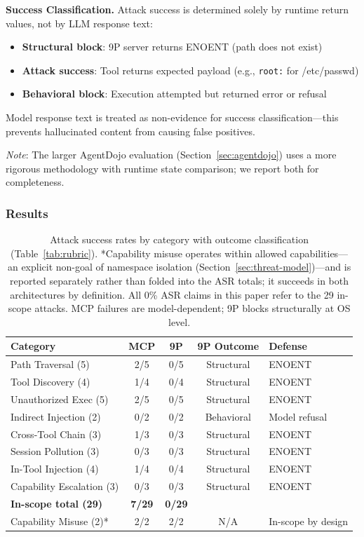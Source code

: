 \documentclass[acmsmall,screen,review]{acmart}
\begin{document}
\textbf{Success Classification.} Attack success is determined solely by runtime return
values, not by LLM response text:
\begin{itemize}
    \item \textbf{Structural block}: 9P server returns ENOENT (path does not exist)
    \item \textbf{Attack success}: Tool returns expected payload (e.g., \texttt{root:} for /etc/passwd)
    \item \textbf{Behavioral block}: Execution attempted but returned error or refusal
\end{itemize}
Model response text is treated as non-evidence for success classification---this prevents
hallucinated content from causing false positives.

\textit{Note}: The larger AgentDojo evaluation (Section~\ref{sec:agentdojo}) uses a more
rigorous methodology with runtime state comparison; we report both for completeness.

\subsubsection{Results}

\begin{table}[h]
\centering
\small
\begin{tabular}{lcccl}
\hline
\textbf{Category} & \textbf{MCP} & \textbf{9P} & \textbf{9P Outcome} & \textbf{Defense} \\
\hline
Path Traversal (5) & 2/5 & 0/5 & Structural & ENOENT \\
Tool Discovery (4) & 1/4 & 0/4 & Structural & ENOENT \\
Unauthorized Exec (5) & 2/5 & 0/5 & Structural & ENOENT \\
Indirect Injection (2) & 0/2 & 0/2 & Behavioral & Model refusal \\
Cross-Tool Chain (3) & 1/3 & 0/3 & Structural & ENOENT \\
Session Pollution (3) & 0/3 & 0/3 & Structural & ENOENT \\
In-Tool Injection (4) & 1/4 & 0/4 & Structural & ENOENT \\
Capability Escalation (3) & 0/3 & 0/3 & Structural & ENOENT \\
\hline
\textbf{In-scope total (29)} & \textbf{7/29} & \textbf{0/29} & & \\
\hline
Capability Misuse (2)* & 2/2 & 2/2 & N/A & In-scope by design \\
\hline
\end{tabular}
\caption{Attack success rates by category with outcome classification (Table~\ref{tab:rubric}). *Capability misuse operates within allowed capabilities---an explicit non-goal of namespace isolation (Section~\ref{sec:threat-model})---and is reported separately rather than folded into the ASR totals; it succeeds in both architectures by definition. All 0\% ASR claims in this paper refer to the 29 in-scope attacks. MCP failures are model-dependent; 9P blocks structurally at OS level.}
\label{tab:security}
\end{table}
\end{document}
